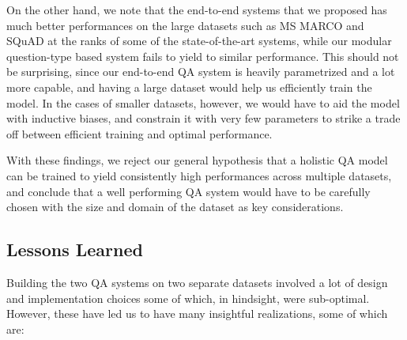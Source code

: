On the other hand, we note that the end-to-end systems that we proposed has much better performances on the large datasets such as MS MARCO and SQuAD at the ranks of some of the state-of-the-art systems, while our modular question-type based system fails to yield to similar performance. This should not be surprising, since our end-to-end QA system is heavily parametrized and a lot more capable, and having a large dataset would help us efficiently train the model. In the cases of smaller datasets, however, we would have to aid the model with inductive biases, and constrain it with very few parameters to strike a trade off between efficient training and optimal performance. 

With these findings, we reject our general hypothesis that a holistic QA model can be trained to yield consistently high performances across multiple datasets, and conclude that a well performing QA system would have to be carefully chosen with the size and domain of the dataset as key considerations.

\subsection{Lessons Learned}

Building the two QA systems on two separate datasets involved a lot of design and implementation choices some of which, in hindsight, were sub-optimal. However, these have led us to have many insightful realizations, some of which are:

